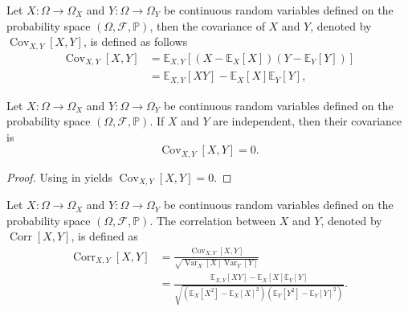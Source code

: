\begin{definition}[Covariance]
	\label{def:covariance}
	Let $X\colon \Omega \to \Omega_X$ and $Y\colon \Omega \to \Omega_Y$ be continuous random variables defined on the probability space $(\Omega, \mathcal{F}, \mathbb{P})$, then the covariance of $X$ and $Y$, denoted by $\operatorname{Cov}_{X,Y}[X,Y]$, is defined as follows
	\begin{equation}
		\begin{split}
			\operatorname{Cov}_{X,Y}[X,Y]&=\mathbb{E}_{X,Y}[(X-\mathbb{E}_X[X])(Y-\mathbb{E}_Y[Y])]\\
			&=\mathbb{E}_{X,Y}[XY]-\mathbb{E}_X[X]\mathbb{E}_Y[Y],
		\end{split}
	\end{equation}
\end{definition}
\begin{theorem}
	\label{theorem:covariance_of_independent_variables}
	Let $X\colon \Omega \to \Omega_X$ and $Y\colon \Omega \to \Omega_Y$ be continuous random variables defined on the probability space $(\Omega, \mathcal{F}, \mathbb{P})$. If $X$ and $Y$ are independent, then their covariance is
	\begin{equation}
		\operatorname{Cov}_{X,Y}[X,Y] = 0.
	\end{equation}
\end{theorem}
\begin{proof}
	Using  in  yields $\operatorname{Cov}_{X,Y}[X,Y]=0$.
\end{proof}

\begin{definition}[Correlation]
	\label{def:correlation}
	Let $X\colon \Omega \to \Omega_X$ and $Y\colon \Omega \to \Omega_Y$ be continuous random variables defined on the probability space $(\Omega, \mathcal{F}, \mathbb{P})$. The correlation between $X$ and $Y$, denoted by $\operatorname{Corr}[X,Y]$, is defined as
	\begin{equation}
		\begin{split}
			\operatorname{Corr}_{X,Y}[X,Y] &= \frac{\operatorname{Cov}_{X,Y}[X,Y]}{\sqrt{\operatorname{Var}_X[X]  \operatorname{Var}_Y[Y]}} \\
			&= \frac{\mathbb{E}_{X,Y}[XY]-\mathbb{E}_X[X]\mathbb{E}_Y[Y]}{\sqrt{\left(\mathbb{E}_X[X^2] - \mathbb{E}_X[X]^2\right) \left(\mathbb{E}_Y[Y^2] - \mathbb{E}_Y[Y]^2\right)}}.
		\end{split}
	\end{equation}
\end{definition}

